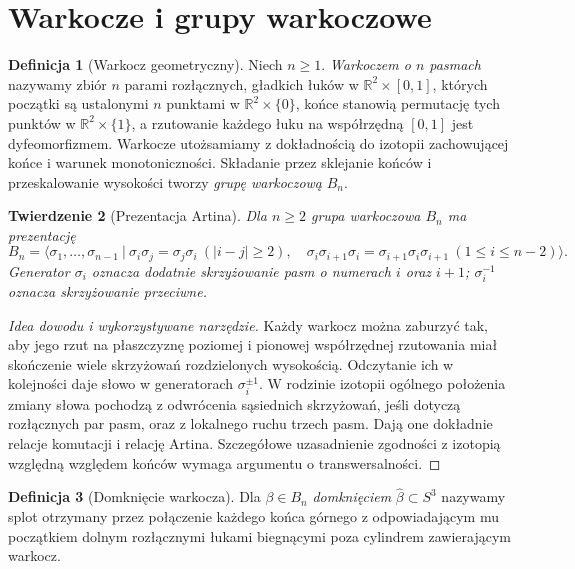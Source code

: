 \documentclass[11pt,a4paper]{report}
\numberwithin{equation}{section}
\theoremstyle{plain}
\newtheorem{twierdzenie}{Twierdzenie}[section]
\theoremstyle{definition}
\newtheorem{definicja}[twierdzenie]{Definicja}
\theoremstyle{remark}
\begin{document}
\section{Warkocze i grupy warkoczowe}
\label{sec:kt-warkocze}

\begin{definicja}[Warkocz geometryczny]
Niech $n\geq1$. \emph{Warkoczem o $n$ pasmach} nazywamy
zbiór $n$ parami rozłącznych, gładkich łuków w
$\mathbb R^2\times[0,1]$, których początki są ustalonymi
$n$ punktami w $\mathbb R^2\times\{0\}$, końce stanowią
permutację tych punktów w $\mathbb R^2\times\{1\}$,
a rzutowanie każdego łuku na współrzędną $[0,1]$
jest dyfeomorfizmem. Warkocze utożsamiamy z dokładnością
do izotopii zachowującej końce i warunek monotoniczności.
Składanie przez sklejanie końców i przeskalowanie wysokości
tworzy \emph{grupę warkoczową} $B_n$.
\end{definicja}

\begin{twierdzenie}[Prezentacja Artina]
Dla $n\geq2$ grupa warkoczowa $B_n$ ma prezentację
\[
B_n=\Big\langle\sigma_1,\ldots,\sigma_{n-1}\ \Big|\ 
\sigma_i\sigma_j=\sigma_j\sigma_i\ (|i-j|\geq2),\quad
\sigma_i\sigma_{i+1}\sigma_i=\sigma_{i+1}\sigma_i\sigma_{i+1}
\ (1\leq i\leq n-2)\Big\rangle.
\]
Generator $\sigma_i$ oznacza dodatnie skrzyżowanie pasm
o numerach $i$ oraz $i+1$; $\sigma_i^{-1}$ oznacza
skrzyżowanie przeciwne.
\end{twierdzenie}

\begin{proof}[Idea dowodu i wykorzystywane narzędzie]
Każdy warkocz można zaburzyć tak, aby jego rzut na płaszczyznę
poziomej i pionowej współrzędnej rzutowania miał skończenie wiele
skrzyżowań rozdzielonych wysokością. Odczytanie ich w kolejności
daje słowo w generatorach $\sigma_i^{\pm1}$.
W rodzinie izotopii ogólnego położenia zmiany słowa pochodzą
z odwrócenia sąsiednich skrzyżowań, jeśli dotyczą rozłącznych
par pasm, oraz z lokalnego ruchu trzech pasm. Dają one
dokładnie relacje komutacji i relację Artina. Szczegółowe
uzasadnienie zgodności z izotopią względną względem końców
wymaga argumentu o transwersalności.
\end{proof}

\begin{definicja}[Domknięcie warkocza]
Dla $\beta\in B_n$ \emph{domknięciem} $\widehat\beta\subset S^3$
nazywamy splot otrzymany przez połączenie każdego końca
górnego z odpowiadającym mu początkiem dolnym rozłącznymi
łukami biegnącymi poza cylindrem zawierającym warkocz.
\end{definicja}
\end{document}
